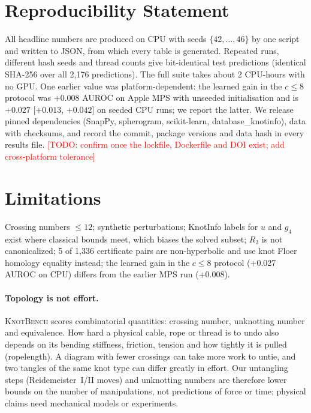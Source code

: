 \documentclass{article}
\newcommand{\todo}[1]{\textcolor{red}{[TODO: #1]}}
\begin{document}
\section{Reproducibility Statement}\label{sec:repro}
All headline numbers are produced on CPU with seeds $\{42,\dots,46\}$ by one
script and written to JSON, from which every table is generated. Repeated runs,
different hash seeds and thread counts give bit-identical test predictions
(identical SHA-256 over all 2{,}176 predictions). The full suite takes about
2 CPU-hours with no GPU. One earlier value was platform-dependent: the learned
gain in the $c{\le}8$ protocol was $+0.008$ AUROC on Apple MPS with unseeded
initialisation and is $+0.027$ [$+0.013$, $+0.042$] on seeded CPU runs; we
report the latter. We release pinned dependencies (SnapPy, spherogram,
scikit-learn, database\_knotinfo), data with checksums, and record the commit,
package versions and data hash in every results file. \todo{confirm once the
lockfile, Dockerfile and DOI exist; add cross-platform tolerance}

\section{Limitations}\label{sec:limits}
Crossing numbers $\le 12$; synthetic perturbations; KnotInfo labels for $u$ and
$g_4$ exist where classical bounds meet, which biases the solved subset; $R_3$
is not canonicalized; 5 of 1{,}336 certificate pairs are non-hyperbolic and use
knot Floer homology equality instead; the learned gain in the $c{\le}8$ protocol
(+0.027 AUROC on CPU) differs from the earlier MPS run (+0.008).

\paragraph{Topology is not effort.} \textsc{KnotBench} scores combinatorial
quantities: crossing number, unknotting number and equivalence. How hard a
physical cable, rope or thread is to undo also depends on its bending
stiffness, friction, tension and how tightly it is pulled (ropelength). A
diagram with fewer crossings can take more work to untie, and two tangles of the
same knot type can differ greatly in effort. Our untangling steps
(Reidemeister~I/II moves) and unknotting numbers are therefore lower bounds on
the number of manipulations, not predictions of force or time; physical claims
need mechanical models or experiments.
\end{document}
